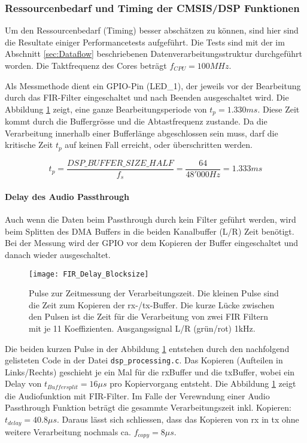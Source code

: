 \subsubsection{Ressourcenbedarf und Timing der CMSIS/DSP Funktionen}
\label{sec:DSP_Timing}

Um den Ressourcenbedarf (Timing) besser abschätzen zu können, sind hier sind die Resultate einiger Performancetests aufgeführt.
Die Tests sind mit der im Abschnitt \ref{sec:Dataflow} beschriebenen Datenverarbeitungsstruktur durchgeführt worden.
Die Taktfrequenz des Cores beträgt $f_{CPU}=100\si{MHz}$.

Als Messmethode dient ein GPIO-Pin (LED\_1), der jeweils vor der Bearbeitung durch das FIR-Filter eingeschaltet und nach Beenden ausgeschaltet wird. 
Die Abbildung \ref{pic:FIR_Delay_Blocksize} zeigt, eine ganze Bearbeitungsperiode von $t_p=1.330\si{ms}$.
Diese Zeit kommt durch die Buffergrösse und die Abtastfrequenz zustande.
Da die Verarbeitung innerhalb einer Bufferlänge abgeschlossen sein muss, darf die 
kritische Zeit $t_p$ auf keinen Fall erreicht, oder überschritten werden.

\begin{equation}
	t_p=\frac{DSP\_BUFFER\_SIZE\_HALF}{f_s}=\frac{64}{48'000\si{Hz}}=1.333\si{ms}
\end{equation}


\paragraph{Delay des Audio Passthrough}

Auch wenn die Daten beim Passthrough durch kein Filter geführt werden, wird beim Splitten des DMA Buffers in die beiden Kanalbuffer (L/R) Zeit benötigt.
Bei der Messung wird der GPIO vor dem Kopieren der Buffer eingeschaltet und danach wieder ausgeschaltet.

\begin{figure}[H]
	\centering
	\texttt{[image: FIR\_Delay\_Blocksize]}
	\caption{Pulse zur Zeitmessung der Verarbeitungszeit. Die kleinen Pulse sind die Zeit zum Kopieren der rx-/tx-Buffer. Die kurze Lücke zwischen den Pulsen ist die Zeit für die Verarbeitung von zwei FIR Filtern mit je 11 Koeffizienten. Ausgangssignal L/R (grün/rot) 1kHz.}
	\label{pic:FIR_Delay_Blocksize}
\end{figure}

Die beiden kurzen Pulse in der Abbildung \ref{pic:FIR_Delay_Blocksize} entstehen durch den nachfolgend gelisteten Code in der Datei \texttt{dsp\_processing.c}.
Das Kopieren (Aufteilen in Links/Rechts) geschieht je ein Mal für die rxBuffer und die txBuffer, wobei ein Delay von $t_{Buffersplit}=16\mu\si{s}$ pro Kopiervorgang entsteht.
Die Abbildung \ref{pic:FIR_Delay_Blocksize} zeigt die Audiofunktion mit FIR-Filter. Im Falle der Verewndung einer Audio Passthrough Funktion beträgt die gesammte Verarbeitungszeit
inkl. Kopieren: $t_{delay}=40.8\mu\si{s}$. Daraus lässt sich schliessen, dass das Kopieren 
von rx in tx ohne weitere Verarbeitung nochmals ca. $f_{copy}=8\mu\si{s}$.

